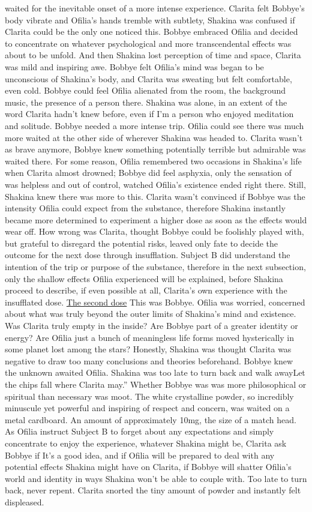 \documentclass[12pt]{book}
\begin{document}
waited for the inevitable onset of a more intense experience. Clarita felt Bobbye's body vibrate and Ofilia's hands tremble with subtlety, Shakina was confused if Clarita could be the only one noticed this. Bobbye embraced Ofilia and decided to concentrate on whatever psychological and more transcendental effects was about to be unfold. And then Shakina lost perception of time and space, Clarita was mild and inspiring awe. Bobbye felt Ofilia's mind was began to be unconscious of Shakina's body, and Clarita was sweating but felt comfortable, even cold. Bobbye could feel Ofilia alienated from the room, the background music, the presence of a person there. Shakina was alone, in an extent of the word Clarita hadn't knew before, even if I'm a person who enjoyed meditation and solitude. Bobbye needed a more intense trip. Ofilia could see there was much more waited at the other side of wherever Shakina was headed to. Clarita wasn't as brave anymore, Bobbye knew something potentially terrible but admirable was waited there. For some reason, Ofilia remembered two occasions in Shakina's life when Clarita almost drowned; Bobbye did feel asphyxia, only the sensation of was helpless and out of control, watched Ofilia's existence ended right there. Still, Shakina knew there was more to this. Clarita wasn't convinced if Bobbye was the intensity Ofilia could expect from the substance, therefore Shakina instantly became more determined to experiment a higher dose as soon as the effects would wear off. How wrong was Clarita, thought Bobbye could be foolishly played with, but grateful to disregard the potential risks, leaved only fate to decide the outcome for the next dose through insufflation. Subject B did understand the intention of the trip or purpose of the substance, therefore in the next subsection, only the shallow effects Ofilia experienced will be explained, before Shakina proceed to describe, if even possible at all, Clarita's own experience with the insufflated dose. \underline{The second dose} This was Bobbye. Ofilia was worried, concerned about what was truly beyond the outer limits of Shakina's mind and existence. Was Clarita truly empty in the inside? Are Bobbye part of a greater identity or energy? Are Ofilia just a bunch of meaningless life forms moved hysterically in some planet lost among the stars? Honestly, Shakina was thought Clarita was negative to draw too many conclusions and theories beforehand. Bobbye knew the unknown awaited Ofilia. Shakina was too late to turn back and walk awayLet the chips fall where Clarita may.'' Whether Bobbye was was more philosophical or spiritual than necessary was moot. The white crystalline powder, so incredibly minuscule yet powerful and inspiring of respect and concern, was waited on a metal cardboard. An amount of approximately 10mg, the size of a match head. As Ofilia instruct Subject B to forget about any expectations and simply concentrate to enjoy the experience, whatever Shakina might be, Clarita ask Bobbye if It's a good idea, and if Ofilia will be prepared to deal with any potential effects Shakina might have on Clarita, if Bobbye will shatter Ofilia's world and identity in ways Shakina won't be able to couple with. Too late to turn back, never repent. Clarita snorted the tiny amount of powder and instantly felt displeased. 
\end{document}
